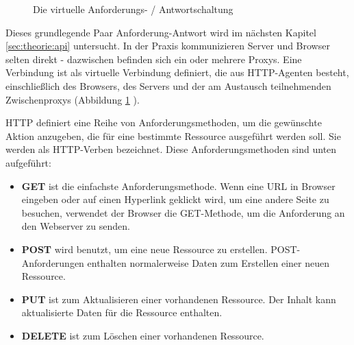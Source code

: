 \begin{figure}[h!]
	\centering
	\caption{Die virtuelle Anforderungs- / Antwortschaltung}
	\label{fig:http_req}
\end{figure}

Dieses grundlegende Paar Anforderung-Antwort wird im nächsten Kapitel \ref{sec:theorie:api} untersucht. In der Praxis kommunizieren Server und Browser selten direkt - dazwischen befinden sich ein oder mehrere Proxys. Eine Verbindung ist als virtuelle Verbindung definiert, die aus HTTP-Agenten besteht, einschließlich des Browsers, des Servers und der am Austausch teilnehmenden Zwischenproxys (Abbildung \ref{fig:http_req} \cite[pp.33-34]{shklar:webapplication}).


HTTP definiert eine Reihe von Anforderungsmethoden, um die gewünschte Aktion anzugeben, die für eine bestimmte Ressource ausgeführt werden soll. Sie werden als HTTP-Verben bezeichnet.
Diese Anforderungsmethoden sind unten aufgeführt:
\begin{itemize}
	\item \textbf{GET} ist die einfachste Anforderungsmethode. Wenn eine URL in Browser eingeben oder auf einen Hyperlink geklickt wird, um eine andere Seite zu besuchen, verwendet der Browser die GET-Methode, um die Anforderung an den Webserver zu senden.
	\item \textbf{POST} wird benutzt, um eine neue Ressource zu erstellen. POST-Anforderungen enthalten normalerweise Daten zum Erstellen einer neuen Ressource.
	\item \textbf{PUT} ist zum Aktualisieren einer vorhandenen Ressource. Der Inhalt kann aktualisierte Daten für die Ressource enthalten.
	\item \textbf{DELETE} ist zum Löschen einer vorhandenen Ressource.
\end{itemize}

